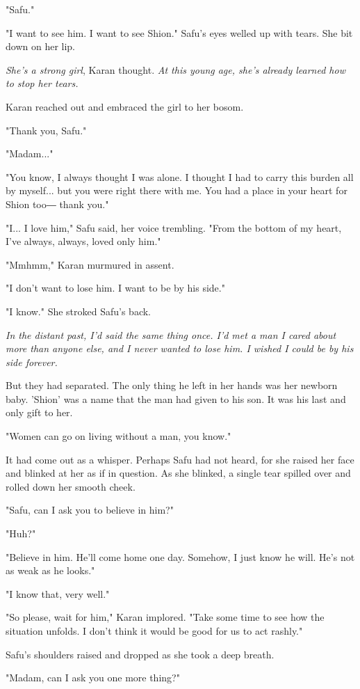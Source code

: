 "Safu."

"I want to see him. I want to see Shion." Safu's eyes welled up with
tears. She bit down on her lip.

\emph{She's a strong girl}, Karan thought. \emph{At this young age, she's already
learned how to stop her tears.}

Karan reached out and embraced the girl to her bosom.

"Thank you, Safu."

"Madam..."

"You know, I always thought I was alone. I thought I had to carry this
burden all by myself... but you were right there with me. You had a
place in your heart for Shion too― thank you."

"I... I love him," Safu said, her voice trembling. "From the bottom of
my heart, I've always, always, loved only him."

"Mmhmm," Karan murmured in assent.

"I don't want to lose him. I want to be by his side."

"I know." She stroked Safu's back.

\emph{In the distant past, I'd said the same thing once. I'd met a man I cared
about more than anyone else, and I never wanted to lose him. I wished I
could be by his side forever.}

But they had separated. The only thing he left in her hands was her
newborn baby. 'Shion' was a name that the man had given to his son. It
was his last and only gift to her.

"Women can go on living without a man, you know."

It had come out as a whisper. Perhaps Safu had not heard, for she raised
her face and blinked at her as if in question. As she blinked, a single
tear spilled over and rolled down her smooth cheek.

"Safu, can I ask you to believe in him?"

"Huh?"

"Believe in him. He'll come home one day. Somehow, I just know he will.
He's not as weak as he looks."

"I know that, very well."

"So please, wait for him," Karan implored. "Take some time to see how
the situation unfolds. I don't think it would be good for us to act
rashly."

Safu's shoulders raised and dropped as she took a deep breath.

"Madam, can I ask you one more thing?"

